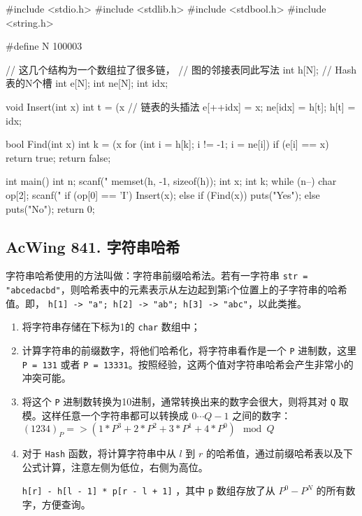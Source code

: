 \begin{mycpptwocol}[拉链法]
    #include <stdio.h>
    #include <stdlib.h>
    #include <stdbool.h>
    #include <string.h>

    #define N 100003

    // 这几个结构为一个数组拉了很多链，
    // 图的邻接表同此写法
    int h[N]; // Hash表的N个槽
    int e[N];
    int ne[N];
    int idx;

    void Insert(int x)
        {
        int t = (x %
        // 链表的头插法
        e[++idx] = x;
        ne[idx] = h[t];
        h[t] = idx;
    }

    bool Find(int x)
        {
        int k = (x %
        for (int i = h[k]; i != -1; i = ne[i]) {
            if (e[i] == x) {
                return true;
            }
        }
        return false;
    }

    int main()
        {
        int n;
        scanf("%
        memset(h, -1, sizeof(h));
        int x;
        int k;
        while (n--) {
            char op[2];
            scanf("%
            if (op[0] == 'I') {
                Insert(x);
            } else {
                if (Find(x)) {
                    puts("Yes");
                } else {
                    puts("No");
                }
            }
        }
        return 0;
    }
\end{mycpptwocol}

\subsection{AcWing 841. 字符串哈希}

字符串哈希使用的方法叫做：字符串前缀哈希法。若有一字符串 \lstinline{str = "abcedacbd"}，则哈希表中的元素表示从左边起到第i个位置上的子字符串的哈希值。即， \lstinline{h[1] -> "a"; h[2] -> "ab"; h[3] -> "abc"}，以此类推。

\begin{enumerate}
    \item 将字符串存储在下标为1的 \lstinline{char} 数组中；
    \item 计算字符串的前缀数字，将他们哈希化，将字符串看作是一个 \lstinline{P} 进制数，这里 \lstinline{P = 131} 或者 \lstinline{P = 13331}。按照经验，这两个值对字符串哈希会产生非常小的冲突可能。
    \item 将这个 \lstinline{P} 进制数转换为10进制，通常转换出来的数字会很大，则将其对 \lstinline{Q} 取模。这样任意一个字符串都可以转换成 $0 \cdots Q - 1$ 之间的数字：$(1234)_P => (1 * P^3 + 2 * P^2 + 3 * P^1 + 4 * P^0) \mod Q$
    \item 对于 \lstinline{Hash} 函数，将计算字符串中从 $l$ 到 $r$ 的哈希值，通过前缀哈希表以及下公式计算，注意左侧为低位，右侧为高位。

    \lstinline{h[r] - h[l - 1] * p[r - l + 1]} ，其中 \lstinline{p} 数组存放了从 $P^0 - P^N$ 的所有数字，方便查询。
\end{enumerate}

